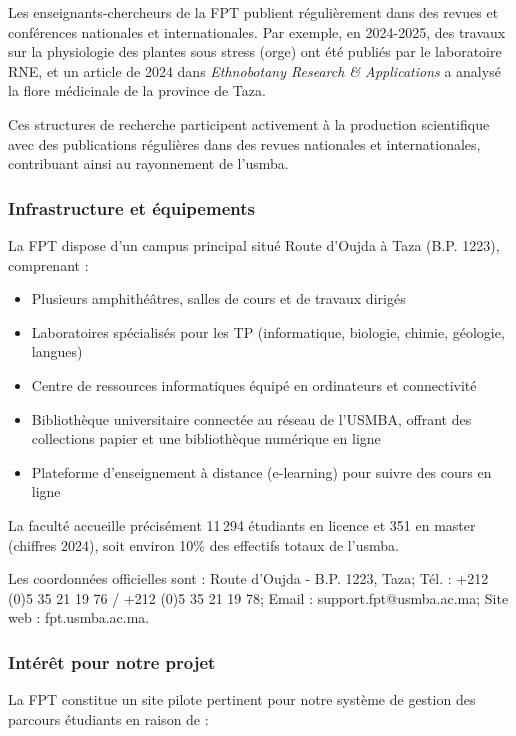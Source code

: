 \documentclass[french,12pt]{report} %
\begin{document}
Les enseignants-chercheurs de la FPT publient régulièrement dans des revues et conférences nationales et internationales. Par exemple, en 2024-2025, des travaux sur la physiologie des plantes sous stress (orge) ont été publiés par le laboratoire RNE, et un article de 2024 dans \textit{Ethnobotany Research \& Applications} a analysé la flore médicinale de la province de Taza.

Ces structures de recherche participent activement à la production scientifique avec des publications régulières dans des revues nationales et internationales, contribuant ainsi au rayonnement de l'\gls{usmba}.

\subsubsection{Infrastructure et équipements}

La FPT dispose d'un campus principal situé Route d'Oujda à Taza (B.P. 1223), comprenant :

\begin{itemize}
    \item Plusieurs amphithéâtres, salles de cours et de travaux dirigés
    \item Laboratoires spécialisés pour les TP (informatique, biologie, chimie, géologie, langues)
    \item Centre de ressources informatiques équipé en ordinateurs et connectivité
    \item Bibliothèque universitaire connectée au réseau de l'USMBA, offrant des collections papier et une bibliothèque numérique en ligne
    \item Plateforme d'enseignement à distance (e-learning) pour suivre des cours en ligne
\end{itemize}

La faculté accueille précisément 11\,294 étudiants en licence et 351 en master (chiffres 2024), soit environ 10\% des effectifs totaux de l'\gls{usmba}.

Les coordonnées officielles sont : Route d'Oujda - B.P. 1223, Taza; Tél. : +212 (0)5 35 21 19 76 / +212 (0)5 35 21 19 78; Email : support.fpt@usmba.ac.ma; Site web : fpt.usmba.ac.ma.

\subsubsection{Intérêt pour notre projet}

La FPT constitue un site pilote pertinent pour notre système de gestion des parcours étudiants en raison de :
\end{document}
